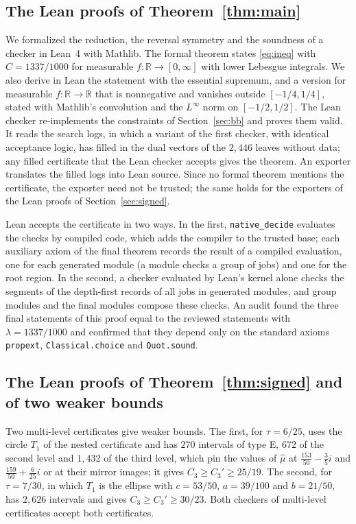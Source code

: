 \documentclass[11pt]{amsart}
\theoremstyle{definition}
\theoremstyle{remark}
\numberwithin{equation}{section}
\newcommand{\R}{\mathbb{R}}
\newcommand{\NleavesU}{2{,}446}
\newcommand{\PinPoint}{\tfrac{153}{50}-\tfrac35i}
\newcommand{\PinPointTwo}{\tfrac{159}{50}+\tfrac{6}{25}i}
\newcommand{\LeanSigSlash}{25/19}
\newcommand{\TabE}{270}
\newcommand{\TabH}{672}
\newcommand{\TabHthree}{1{,}432}
\begin{document}
\subsection*{The Lean proofs of Theorem~\ref{thm:main}} We formalized the reduction, the reversal symmetry and the soundness of a checker in Lean~4 with Mathlib. The formal theorem states \eqref{eq:ineq} with $C=1337/1000$ for measurable $f\colon\R\to[0,\infty]$ with lower Lebesgue integrals. We also derive in Lean the statement with the essential supremum, and a version for measurable $f\colon\R\to\R$ that is nonnegative and vanishes outside $[-1/4,1/4]$, stated with Mathlib's convolution and the $L^\infty$ norm on $[-1/2,1/2]$. The Lean checker re-implements the constraints of Section~\ref{sec:bb} and proves them valid. It reads the search logs, in which a variant of the first checker, with identical acceptance logic, has filled in the dual vectors of the $\NleavesU$ leaves without data; any filled certificate that the Lean checker accepts gives the theorem. An exporter translates the filled logs into Lean source. Since no formal theorem mentions the certificate, the exporter need not be trusted; the same holds for the exporters of the Lean proofs of Section~\ref{sec:signed}.

Lean accepts the certificate in two ways. In the first, \texttt{native\_decide} evaluates the checks by compiled code, which adds the compiler to the trusted base; each auxiliary axiom of the final theorem records the result of a compiled evaluation, one for each generated module (a module checks a group of jobs) and one for the root region. In the second, a checker evaluated by Lean's kernel alone checks the segments of the depth-first records of all jobs in generated modules, and group modules and the final modules compose these checks. An audit found the three final statements of this proof equal to the reviewed statements with $\lambda=1337/1000$ and confirmed that they depend only on the standard axioms \texttt{propext}, \texttt{Classical.choice} and \texttt{Quot.sound}.

\subsection*{The Lean proofs of Theorem~\ref{thm:signed} and of two weaker bounds} Two multi-level certificates give weaker bounds. The first, for $\tau=6/25$, uses the circle $T_1$ of the nested certificate and has $\TabE$ intervals of type E, $\TabH$ of the second level and $\TabHthree$ of the third level, which pin the values of $\hat\mu$ at $\PinPoint$ and $\PinPointTwo$ or at their mirror images; it gives $C_3\ge C_3'\ge\LeanSigSlash$. The second, for $\tau=7/30$, in which $T_1$ is the ellipse with $c=53/50$, $a=39/100$ and $b=21/50$, has $2{,}626$ intervals and gives $C_3\ge C_3'\ge30/23$. Both checkers of multi-level certificates accept both certificates.
\end{document}
